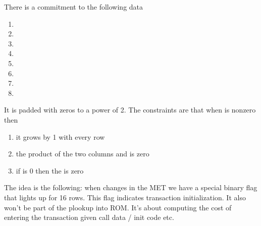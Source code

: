 There is a commitment to the following data
\begin{enumerate}
	\item {}
	\item {}
	\item {}
	\item {}
	\item {}
	\item {}
	\item {}
	\item {}
\end{enumerate}
It is padded with zeros to a power of 2. The constraints are that when  is nonzero then
\begin{enumerate}
	\item it grows by 1 with every row
	\item the product of the two columns  and  is zero
	\item if  is 0 then the  is zero
\end{enumerate}
The idea is the following: when  changes in the MET we have a special binary flag that lights up for 16 rows. This flag indicates transaction initialization. It also won't be part of the plookup into ROM. It's about computing the cost of entering the transaction given call data / init code etc.